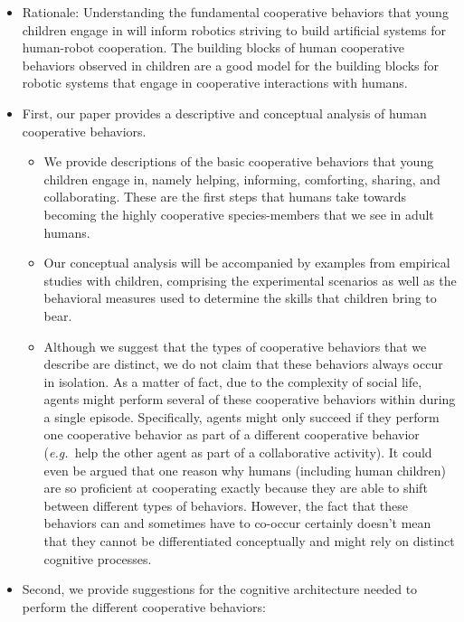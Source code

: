 \documentclass{article}
\newcommand{\eg}{{\textit{e.g.~}}}
\begin{document}
\begin{itemize}

\item Rationale: Understanding the fundamental cooperative behaviors that young
children engage in will inform robotics striving to build artificial systems
for human-robot cooperation. The building blocks of human cooperative behaviors
observed in children are a good model for the building blocks for robotic
systems that engage in cooperative interactions with humans.

\item First, our paper provides a descriptive and conceptual analysis of human
cooperative behaviors.

	\begin{itemize}

	\item We provide descriptions of the basic cooperative behaviors that young
	children engage in, namely helping, informing, comforting, sharing, and
	collaborating. These are the first steps that humans take towards becoming
	the highly cooperative species-members that we see in adult humans.

	\item Our conceptual analysis will be accompanied by examples from
	empirical studies with children, comprising the experimental scenarios as
	well as the behavioral measures used to determine the skills that children
	bring to bear.

	\item Although we suggest that the types of cooperative behaviors that we
	describe are distinct, we do not claim that these behaviors always occur in
	isolation. As a matter of fact, due to the complexity of social life,
	agents might perform several of these cooperative behaviors within during a
	single episode. Specifically, agents might only succeed if they perform one
	cooperative behavior as part of a different cooperative behavior (\eg help
	the other agent as part of a collaborative activity). It could even be
	argued that one reason why humans (including human children) are so
	proficient at cooperating exactly because they are able to shift between
	different types of behaviors. However, the fact that these behaviors can
	and sometimes have to co-occur certainly doesn{}'t mean that they cannot be
	differentiated conceptually and might rely on distinct cognitive processes.

	\end{itemize}

\item Second, we provide suggestions for the cognitive architecture needed to
perform the different cooperative behaviors:


\end{itemize}
\end{document}
